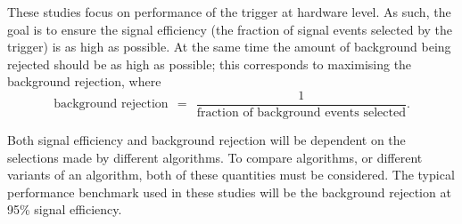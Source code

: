 
These studies focus on performance of the \egamma trigger at hardware level. As
such, the goal is to ensure the signal efficiency (the fraction of signal events
selected by the trigger) is as high as possible. At the same time the amount of
background being rejected should be as high as possible; this corresponds to
maximising the background rejection, where
%
\begin{equation*}
  \text{background~rejection} ~~=~~
  \frac1{\text{fraction~of~background~events~selected}}.
\end{equation*}
%

Both signal efficiency and background rejection will be dependent on the
selections made by different algorithms. To compare algorithms, or different
variants of an algorithm, both of these quantities must be considered.  The
typical performance benchmark used in these studies will be the background
rejection at 95\% signal efficiency.
